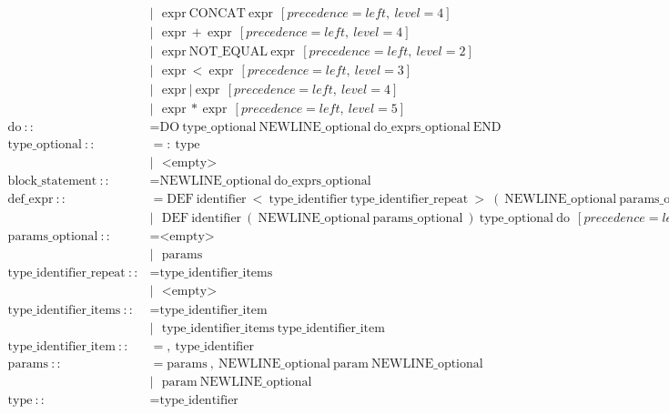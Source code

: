 \documentclass{article}
\begin{document}
\begin{align*}
    &|\ \ \ \text{expr}\ \text{CONCAT}\ \text{expr}\ \ [precedence=left,\ level=4]\\
    &|\ \ \ \text{expr}\ +\ \text{expr}\ \ [precedence=left,\ level=4]\\
    &|\ \ \ \text{expr}\ \text{NOT\_EQUAL}\ \text{expr}\ \ [precedence=left,\ level=2]\\
    &|\ \ \ \text{expr}\ <\ \text{expr}\ \ [precedence=left,\ level=3]\\
    &|\ \ \ \text{expr}\ |\ \text{expr}\ \ [precedence=left,\ level=4]\\
    &|\ \ \ \text{expr}\ *\ \text{expr}\ \ [precedence=left,\ level=5]\\
  \text{do}\ ::&= \text{DO}\ \text{type\_optional}\ \text{NEWLINE\_optional}\ \text{do\_exprs\_optional}\ \text{END}\\
  \text{type\_optional}\ ::&= :\ \text{type}\\
    &|\ \ \ \text{<empty>}\\
  \text{block\_statement}\ ::&= \text{NEWLINE\_optional}\ \text{do\_exprs\_optional}\\
  \text{def\_expr}\ ::&= \text{DEF}\ \text{identifier}\ <\ \text{type\_identifier}\ \text{type\_identifier\_repeat}\ >\ (\ \text{NEWLINE\_optional}\ \text{params\_optional}\ )\ \text{type\_optional}\ \text{do}\ \ [precedence=left,\ level=7]\\
    &|\ \ \ \text{DEF}\ \text{identifier}\ (\ \text{NEWLINE\_optional}\ \text{params\_optional}\ )\ \text{type\_optional}\ \text{do}\ \ [precedence=left,\ level=7]\\
  \text{params\_optional}\ ::&= \text{<empty>}\\
    &|\ \ \ \text{params}\\
  \text{type\_identifier\_repeat}\ ::&= \text{type\_identifier\_items}\\
    &|\ \ \ \text{<empty>}\\
  \text{type\_identifier\_items}\ ::&= \text{type\_identifier\_item}\\
    &|\ \ \ \text{type\_identifier\_items}\ \text{type\_identifier\_item}\\
  \text{type\_identifier\_item}\ ::&= ,\ \text{type\_identifier}\\
  \text{params}\ ::&= \text{params}\ ,\ \text{NEWLINE\_optional}\ \text{param}\ \text{NEWLINE\_optional}\\
    &|\ \ \ \text{param}\ \text{NEWLINE\_optional}\\
  \text{type}\ ::&= \text{type\_identifier}\\

\end{align*}
\end{document}

